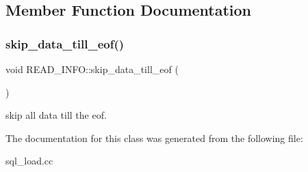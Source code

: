 \subsection{Member Function Documentation}
\mbox{\label{classREAD__INFO_a7dad15b4a0abfca25462672a5d0198fa}} 
\subsubsection{\texorpdfstring{skip\+\_\+data\+\_\+till\+\_\+eof()}{skip\_data\_till\_eof()}}
{\footnotesize\ttfamily void R\+E\+A\+D\+\_\+\+I\+N\+F\+O\+::skip\+\_\+data\+\_\+till\+\_\+eof (\begin{DoxyParamCaption}{ }\end{DoxyParamCaption})\hspace{0.3cm}{\ttfamily [inline]}}

skip all data till the eof. 

The documentation for this class was generated from the following file\+:\begin{DoxyCompactItemize}
\item 
sql\+\_\+load.\+cc\end{DoxyCompactItemize}
